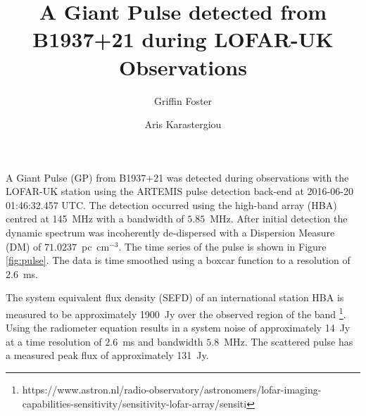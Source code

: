 \documentclass[RNAAS]{aastex62}
\begin{document}
\title{A Giant Pulse detected from B1937+21 during LOFAR-UK Observations}


\author[0000-0002-7559-4291]{Griffin Foster}

\author{Aris Karastergiou}


\section{}

A Giant Pulse (GP) from B1937+21 \citep{1982Natur.300..615B} was detected during
observations with the LOFAR-UK station using the  ARTEMIS
\citep{2015MNRAS.452.1254K} pulse detection back-end at 2016-06-20 01:46:32.457
UTC. The detection occurred using the high-band array (HBA) centred at 145~MHz
with a bandwidth of $5.85$~MHz. After initial detection the dynamic spectrum was
incoherently de-dispersed with a Dispersion Measure (DM) of $71.0237$~pc~cm$^{-3}$.
The time series of the pulse is shown in Figure \ref{fig:pulse}. The data is
time smoothed using a boxcar function to a resolution of $2.6$~ms.

The system equivalent flux density (SEFD) of an international station HBA is
measured to be approximately 1900~Jy over the observed region of the band
\footnote{https://www.astron.nl/radio-observatory/astronomers/lofar-imaging-capabilities-sensitivity/sensitivity-lofar-array/sensiti}.
Using the radiometer equation results in a system noise of approximately 14~Jy
at a time resolution of $2.6$~ms and bandwidth $5.8$~MHz. The scattered pulse has
a measured peak flux of approximately 131~Jy.
\end{document}
